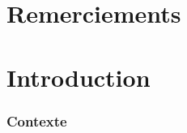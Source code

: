 \documentclass{EPL-master-thesis-covers-FR}
\begin{document}
	\chapter*{Remerciements}

		


	\chapter{Introduction}

		
		\subsection*{Contexte}
		
			
			
			
			

\end{document}
